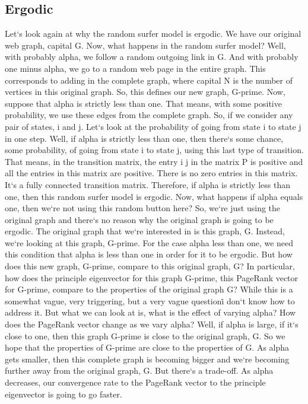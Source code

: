 \subsection{Ergodic}
Let`s look again at why the random surfer model is ergodic.
We have our original web graph, capital G\@.
Now, what happens in the random surfer model? Well, with probably alpha, we follow a random outgoing link in G\@.
And with probably one minus alpha, we go to a random web page in the entire graph.
This corresponds to adding in the complete graph, where capital N is the number of vertices in this original graph.
So, this defines our new graph, G-prime.
Now, suppose that alpha is strictly less than one.
That means, with some positive probability, we use these edges from the complete graph.
So, if we consider any pair of states, i and j.
Let`s look at the probability of going from state i to state j in one step.
Well, if alpha is strictly less than one, then there`s some chance, some probability, of going from state i to state j, using this last type of transition.
That means, in the transition matrix, the entry i j in the matrix P is positive and all the entries in this matrix are positive.
There is no zero entries in this matrix.
It`s a fully connected transition matrix.
Therefore, if alpha is strictly less than one, then this random surfer model is ergodic.
Now, what happens if alpha equals one, then we`re not using this random button here? So, we`re just using the original graph and there`s no reason why the original graph is going to be ergodic.
The original graph that we`re interested in is this graph, G\@.
Instead, we`re looking at this graph, G-prime.
For the case alpha less than one, we need this condition that alpha is less than one in order for it to be ergodic.
But how does this new graph, G-prime, compare to this original graph, G? In particular, how does the principle eigenvector for this graph G-prime, this PageRank vector for G-prime, compare to the properties of the original graph G? While this is a somewhat vague, very triggering, but a very vague question\. i don`t know how to address it.
But what we can look at is, what is the effect of varying alpha? How does the PageRank vector change as we vary alpha? Well, if alpha is large, if it`s close to one, then this graph G-prime is close to the original graph, G\@.
So we hope that the properties of G-prime are close to the properties of G\@.
As alpha gets smaller, then this complete graph is becoming bigger and we`re becoming further away from the original graph, G\@.
But there`s a trade-off.
As alpha decreases, our convergence rate to the PageRank vector to the principle eigenvector is going to go faster.
